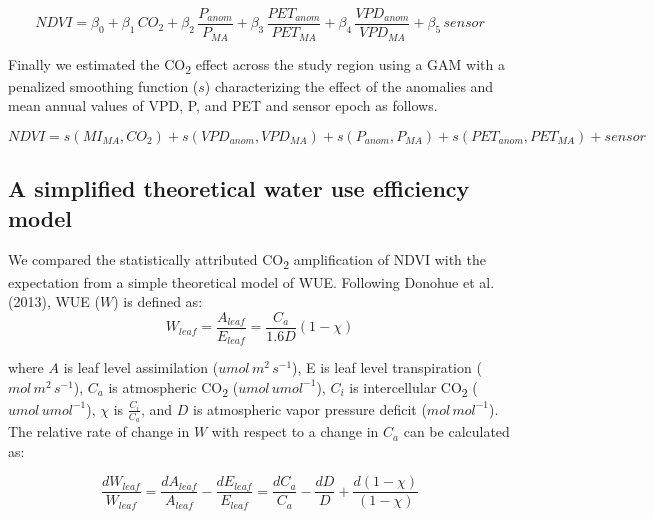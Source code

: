 \documentclass[
]{article}
\begin{document}
\begin{equation}
NDVI=\beta_0+ \beta_1\,CO_2+\beta_2\,\frac{P_{anom}}{P_{MA}}+\beta_3\,\frac{PET_{anom}}{PET_{MA}}+\beta_4\,\frac{VPD_{anom}}{{VPD_{MA}}}+\beta_5\,sensor
\end{equation}

Finally we estimated the CO\textsubscript{2} effect across the study
region using a GAM with a penalized smoothing function (\(s\))
characterizing the effect of the anomalies and mean annual values of
VPD, P, and PET and sensor epoch as follows.

\begin{equation}
NDVI = s(MI_{MA},CO_2) + s(VPD_{anom},VPD_{MA})+s(P_{anom},P_{MA})+s(PET_{anom},PET_{MA})+sensor
\end{equation}

\hypertarget{a-simplified-theoretical-water-use-efficiency-model}{%
\subsection{A simplified theoretical water use efficiency
model}\label{a-simplified-theoretical-water-use-efficiency-model}}

We compared the statistically attributed CO\textsubscript{2}
amplification of NDVI with the expectation from a simple theoretical
model of WUE. Following Donohue et al. (2013), WUE (\(W\)) is defined
as: \begin{equation}
W_{leaf} = \frac{A_{leaf}}{E_{leaf}} = \frac{C_a}{1.6D}(1 - \chi)
\end{equation}

where \(A\) is leaf level assimilation (\(umol\,m^{2}\,s^{-1}\)), E is
leaf level transpiration (\(mol\,m^{2}\,s^{-1}\)), \(C_a\) is
atmospheric CO\textsubscript{2} (\(umol\,umol^{-1}\)), \(C_i\) is
intercellular CO\textsubscript{2} (\(umol\,umol^{-1}\)), \(\chi\) is
\(\frac{C_i}{C_a}\), and \(D\) is atmospheric vapor pressure deficit
(\(mol\,mol^{-1}\)). The relative rate of change in \(W\) with respect
to a change in \(C_a\) can be calculated as:

\begin{equation}
\frac{dW_{leaf}}{W_{leaf}}=\frac{dA_{leaf}}{A_{leaf}} - \frac{dE_{leaf}}{E_{leaf}} = \frac{dC_a}{C_a} - \frac{dD}{D} + \frac{d(1-\chi)}{(1-\chi)}
\end{equation}
\end{document}

